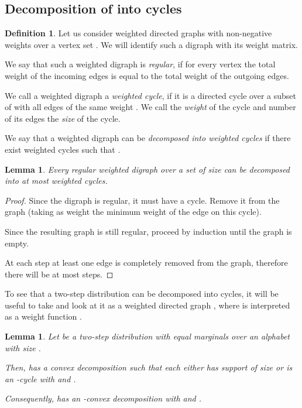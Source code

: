 \documentclass{daj}
\newcommand{\1}{\mathbbm{1}}
\theoremstyle{plain}
\newtheorem{lemma}[theorem]{Lemma}
\theoremstyle{definition}
\newtheorem{definition}[theorem]{Definition}
\begin{document}
\subsection{Decomposition of 
\texorpdfstring{}{P} 
into cycles}

\begin{definition}
Let us consider weighted directed graphs with non-negative weights 
over a vertex set . We will identify such a digraph 
with its weight matrix.

We say that such a weighted digraph is \emph{regular}, if for every vertex
the total weight of the incoming edges is equal to the total weight of
the outgoing edges.

We call a weighted digraph a \emph{weighted cycle}, if it is a directed cycle 
over a subset of  with all edges of the same weight .
We call  the \emph{weight} of the cycle and number of its edges 
the \emph{size} of the cycle.

We say that a weighted digraph  can be 
\emph{decomposed into  weighted cycles}
if there exist weighted cycles   such that 
.
\end{definition}

\begin{lemma}
\label{lem:digraph-decomposition}
Every regular weighted digraph  over a set  of size  
can be decomposed into at most  weighted cycles.
\end{lemma}
\begin{proof}
Since the digraph is regular, it must have a cycle. Remove it from the graph
(taking as weight  the minimum weight of the edge on this cycle).

Since the resulting graph is still regular, 
proceed by induction until the graph is empty.

At each step at least one edge is completely removed from the graph,
therefore there will be at most  steps.
\end{proof}

To see that a two-step distribution  can be decomposed into cycles, 
it will be useful to take  and
look at it as a weighted directed graph ,
where  is interpreted as a weight function 
.

\begin{lemma}
\label{lem:cycle-decomposition}
Let  be a two-step distribution 
with equal marginals 
over an alphabet  with size .

Then,  has a convex decomposition 
 such that each  either
has support of size  or is
an -cycle with  and . 

Consequently,  has an -convex decomposition with
 and .
\end{lemma}
\end{document}
